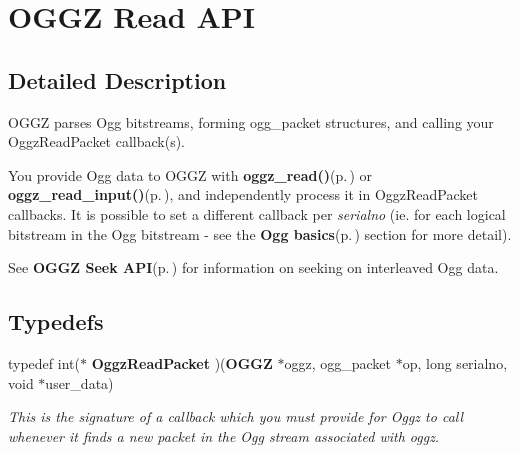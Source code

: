 \section{OGGZ Read API}
\label{group__read__api}


\subsection{Detailed Description}
OGGZ parses Ogg bitstreams, forming ogg\_\-packet structures, and calling your Oggz\-Read\-Packet callback(s). 

You provide Ogg data to OGGZ with {\bf oggz\_\-read()}{\rm (p.\,\pageref{group__read__api_a2})} or {\bf oggz\_\-read\_\-input()}{\rm (p.\,\pageref{group__read__api_a3})}, and independently process it in Oggz\-Read\-Packet callbacks. It is possible to set a different callback per {\em serialno\/} (ie. for each logical bitstream in the Ogg bitstream - see the {\bf Ogg basics}{\rm (p.\,\pageref{group__basics})} section for more detail).

See {\bf OGGZ Seek API}{\rm (p.\,\pageref{group__seek__api})} for information on seeking on interleaved Ogg data. 

\subsection*{Typedefs}
\begin{CompactItemize}
\item 
typedef int($\ast$ {\bf Oggz\-Read\-Packet} )({\bf OGGZ} $\ast$oggz, ogg\_\-packet $\ast$op, long serialno, void $\ast$user\_\-data)
\begin{CompactList}\small\item\em This is the signature of a callback which you must provide for Oggz to call whenever it finds a new packet in the Ogg stream associated with {\em oggz\/}. \item\end{CompactList}\end{CompactItemize}
